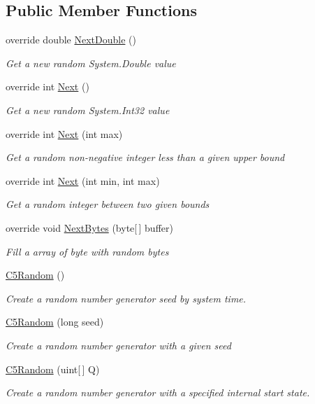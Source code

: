 \subsection*{Public Member Functions}
\begin{DoxyCompactItemize}
\item 
override double \hyperlink{class_c5_1_1_c5_random_a66b68b6fb6e91c24b0a433bac84026e3}{Next\+Double} ()
\begin{DoxyCompactList}\small\item\em Get a new random System.\+Double value \end{DoxyCompactList}\item 
override int \hyperlink{class_c5_1_1_c5_random_a7e0b80136c433144428ac57b3381d14d}{Next} ()
\begin{DoxyCompactList}\small\item\em Get a new random System.\+Int32 value \end{DoxyCompactList}\item 
override int \hyperlink{class_c5_1_1_c5_random_af68b5b18966783cb717d6ca9835d9575}{Next} (int max)
\begin{DoxyCompactList}\small\item\em Get a random non-\/negative integer less than a given upper bound \end{DoxyCompactList}\item 
override int \hyperlink{class_c5_1_1_c5_random_a0c8d4a67fb32149cdf58a61466d40ca8}{Next} (int min, int max)
\begin{DoxyCompactList}\small\item\em Get a random integer between two given bounds \end{DoxyCompactList}\item 
override void \hyperlink{class_c5_1_1_c5_random_af55415fd511db1e7741d34cdc7fb781f}{Next\+Bytes} (byte\mbox{[}$\,$\mbox{]} buffer)
\begin{DoxyCompactList}\small\item\em Fill a array of byte with random bytes \end{DoxyCompactList}\item 
\hyperlink{class_c5_1_1_c5_random_aad64b2b20feaac43d6d6571a22091554}{C5\+Random} ()
\begin{DoxyCompactList}\small\item\em Create a random number generator seed by system time. \end{DoxyCompactList}\item 
\hyperlink{class_c5_1_1_c5_random_a62b56d23ccf63e06ad79cfe4d2da1f41}{C5\+Random} (long seed)
\begin{DoxyCompactList}\small\item\em Create a random number generator with a given seed \end{DoxyCompactList}\item 
\hyperlink{class_c5_1_1_c5_random_a55c96d1007edceb65149cca9793405f6}{C5\+Random} (uint\mbox{[}$\,$\mbox{]} Q)
\begin{DoxyCompactList}\small\item\em Create a random number generator with a specified internal start state. \end{DoxyCompactList}\end{DoxyCompactItemize}
